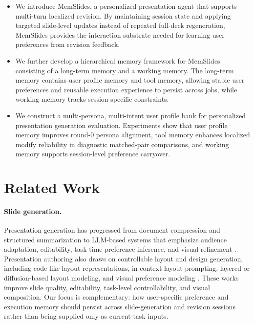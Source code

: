 \documentclass{llmxive}
\providecommand{\methodname}{MemSlides\xspace}
\begin{document}
\setlength{\topsep}{2pt}
\setlength{\partopsep}{0pt}
\setlength{\itemsep}{1pt}
\setlength{\parsep}{0pt}
\begin{itemize}
    \item We introduce \methodname, a personalized presentation agent that
    supports multi-turn localized revision. By maintaining session state and
    applying targeted slide-level updates instead of repeated full-deck
    regeneration, \methodname provides the interaction substrate needed for
    learning user preferences from revision feedback.
    \item We further develop a hierarchical memory framework for \methodname consisting of
    a long-term memory and a working memory. 
    The long-term memory contains user profile memory and tool memory, allowing
    stable user preferences and reusable execution experience to persist across
    jobs, while working memory tracks session-specific constraints.
    \item We construct a multi-persona, multi-intent
    user profile bank for personalized presentation generation evaluation.
    Experiments show that user profile memory improves round-0 persona
    alignment, tool memory enhances localized modify reliability in diagnostic
    matched-pair comparisons, and working memory supports
    session-level preference carryover.
\end{itemize}
\endgroup

\section{Related Work}

\paragraph{Slide generation.}
Presentation generation has progressed from document compression and
structured summarization to LLM-based systems that emphasize audience
adaptation, editability, task-time preference inference, and visual refinement
\citep{sun2021d2s,mondal2024personaaware,zheng2025pptagent,zeng2025slidetailor,zheng2026deeppresenter}.
Presentation authoring also draws on controllable layout and design generation,
including code-like layout representations, in-context layout prompting,
layered or diffusion-based layout modeling, and visual preference modeling
\citep{tang2023layoutnuwa,lin2023layoutprompter,inoue2023layoutdm,zhang2023layoutdiffusion,peng2025designpref}.
These works improve slide quality, editability, task-level controllability, and
visual composition. Our focus is complementary: how user-specific preference
and execution memory should persist across slide-generation and revision
sessions rather than being supplied only as current-task inputs.
\end{document}
